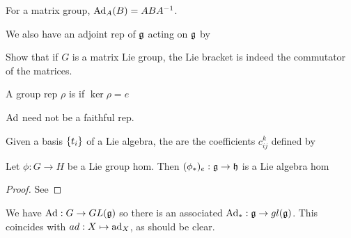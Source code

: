 \documentclass{article}
\begin{document}
\begin{lemma}
For a matrix group, $\operatorname{Ad}_A(B) = ABA^{-1}$. 
\end{lemma}

\begin{definition}
We also have an adjoint rep of $\mathfrak{g}$ acting on $\mathfrak{g}$ by 
\end{definition}

\begin{ex}
	Show that if $G$ is a matrix Lie group, the Lie bracket is indeed the commutator of the matrices. 
\end{ex}

\begin{definition}
	A group rep $\rho$ is  if $\ker \rho = e$
\end{definition}

\begin{fact}
	$\operatorname{Ad}$ need not be a faithful rep. 
\end{fact}

\begin{definition}
	Given a basis $\left\{ t_i \right\}$ of a Lie algebra, the  are the coefficients $c_{ij}^k$ defined by 
\end{definition}

\begin{prop}
	Let $\phi:G \to H$ be a Lie group hom. Then $(\phi_\ast)_e : \mathfrak{g} \to \mathfrak{h}$ is a Lie algebra hom
\end{prop}
\begin{proof}
	See 
\end{proof}

\begin{example}
	We have $\operatorname{Ad}:G \to GL(\mathfrak{g})$ so there is an associated $\operatorname{Ad}_\ast : \mathfrak{g} \to gl(\mathfrak{g})$. This coincides with $ad : X \mapsto \operatorname{ad}_X$, as should be clear. 
\end{example}
\end{document}
